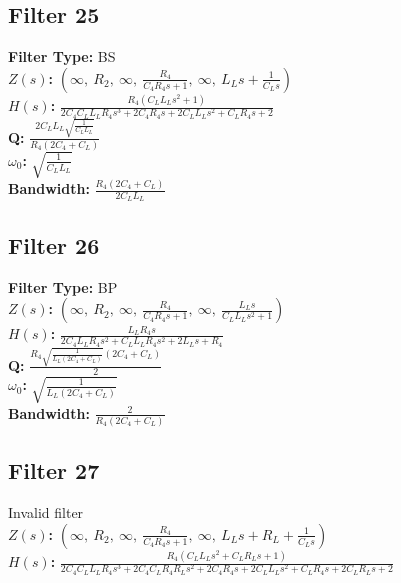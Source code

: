 \documentclass{article}
\begin{document}
\subsection*{Filter 25}
\textbf{Filter Type:} BS \\ 
\textbf{$Z(s)$:} $\left( \infty, \  R_{2}, \  \infty, \  \frac{R_{4}}{C_{4} R_{4} s + 1}, \  \infty, \  L_{L} s + \frac{1}{C_{L} s}\right)$ \\ 
\textbf{$H(s)$:} $\frac{R_{4} \left(C_{L} L_{L} s^{2} + 1\right)}{2 C_{4} C_{L} L_{L} R_{4} s^{3} + 2 C_{4} R_{4} s + 2 C_{L} L_{L} s^{2} + C_{L} R_{4} s + 2}$ \\ 
\textbf{Q:} $\frac{2 C_{L} L_{L} \sqrt{\frac{1}{C_{L} L_{L}}}}{R_{4} \left(2 C_{4} + C_{L}\right)}$ \\ 
\textbf{$\omega_0$:} $\sqrt{\frac{1}{C_{L} L_{L}}}$ \\ 
\textbf{Bandwidth:} $\frac{R_{4} \left(2 C_{4} + C_{L}\right)}{2 C_{L} L_{L}}$ \\ 
\subsection*{Filter 26}
\textbf{Filter Type:} BP \\ 
\textbf{$Z(s)$:} $\left( \infty, \  R_{2}, \  \infty, \  \frac{R_{4}}{C_{4} R_{4} s + 1}, \  \infty, \  \frac{L_{L} s}{C_{L} L_{L} s^{2} + 1}\right)$ \\ 
\textbf{$H(s)$:} $\frac{L_{L} R_{4} s}{2 C_{4} L_{L} R_{4} s^{2} + C_{L} L_{L} R_{4} s^{2} + 2 L_{L} s + R_{4}}$ \\ 
\textbf{Q:} $\frac{R_{4} \sqrt{\frac{1}{L_{L} \left(2 C_{4} + C_{L}\right)}} \left(2 C_{4} + C_{L}\right)}{2}$ \\ 
\textbf{$\omega_0$:} $\sqrt{\frac{1}{L_{L} \left(2 C_{4} + C_{L}\right)}}$ \\ 
\textbf{Bandwidth:} $\frac{2}{R_{4} \left(2 C_{4} + C_{L}\right)}$ \\ 
\subsection*{Filter 27}
Invalid filter \\ 
\textbf{$Z(s)$:} $\left( \infty, \  R_{2}, \  \infty, \  \frac{R_{4}}{C_{4} R_{4} s + 1}, \  \infty, \  L_{L} s + R_{L} + \frac{1}{C_{L} s}\right)$ \\ 
\textbf{$H(s)$:} $\frac{R_{4} \left(C_{L} L_{L} s^{2} + C_{L} R_{L} s + 1\right)}{2 C_{4} C_{L} L_{L} R_{4} s^{3} + 2 C_{4} C_{L} R_{4} R_{L} s^{2} + 2 C_{4} R_{4} s + 2 C_{L} L_{L} s^{2} + C_{L} R_{4} s + 2 C_{L} R_{L} s + 2}$ \\ 
\end{document}
